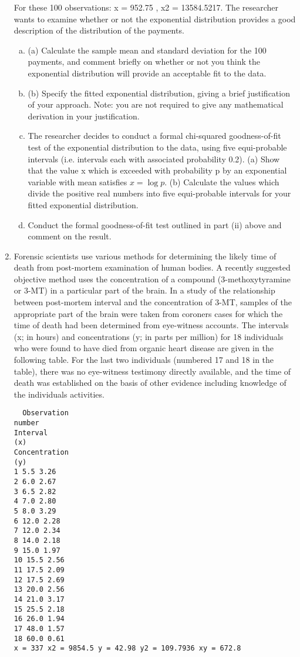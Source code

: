 \documentclass[a4paper,12pt]{article}
\begin{document}
\begin{enumerate}
For these 100 observations: x = 952.75 , x2 = 13584.5217.
The researcher wants to examine whether or not the exponential distribution provides
a good description of the distribution of the payments.
\begin{enumerate}[(a)]
\item (a) Calculate the sample mean and standard deviation for the 100 payments, and comment briefly on whether or not you think the exponential distribution will provide an acceptable fit to the data.
\item (b) Specify the fitted exponential distribution, giving a brief justification of your approach.
Note: you are not required to give any mathematical derivation in your justification.
\item The researcher decides to conduct a formal chi-squared goodness-of-fit test of the exponential distribution to the data, using five equi-probable intervals (i.e. intervals each with associated probability 0.2).
(a) Show that the value x which is exceeded with probability p by an exponential variable with mean satisfies $x = \log p$.
(b) Calculate the values which divide the positive real numbers into five equi-probable intervals for your fitted exponential distribution.
\item  Conduct the formal goodness-of-fit test outlined in part (ii) above and
comment on the result. 
\end{enumerate}
\item Forensic scientists use various methods for determining the likely time of death from
post-mortem examination of human bodies. A recently suggested objective method
uses the concentration of a compound (3-methoxytyramine or 3-MT) in a particular
part of the brain.
In a study of the relationship between post-mortem interval and the concentration of 3-MT, samples of the appropriate part of the brain were taken from coroners cases for which the time of death had been determined from eye-witness accounts. The
intervals (x; in hours) and concentrations (y; in parts per million) for 18 individuals who were found to have died from organic heart disease are given in the following table. For the last two individuals (numbered 17 and 18 in the table), there was no eye-witness testimony directly available, and the time of death was established on the
basis of other evidence including knowledge of the individuals activities.
\begin{verbatim}
  Observation
number
Interval
(x)
Concentration
(y)
1 5.5 3.26
2 6.0 2.67
3 6.5 2.82
4 7.0 2.80
5 8.0 3.29
6 12.0 2.28
7 12.0 2.34
8 14.0 2.18
9 15.0 1.97
10 15.5 2.56
11 17.5 2.09
12 17.5 2.69
13 20.0 2.56
14 21.0 3.17
15 25.5 2.18
16 26.0 1.94
17 48.0 1.57
18 60.0 0.61
x = 337 x2 = 9854.5 y = 42.98 y2 = 109.7936 xy = 672.8  
\end{verbatim}


\end{enumerate}
\end{document}
